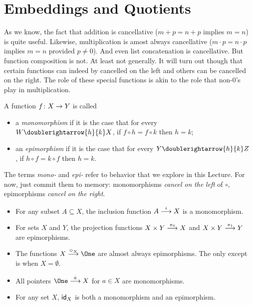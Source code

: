 \section{Embeddings and Quotients}

As we know, the fact that addition is cancellative ($m+p=n+p$ implies $m=n$) is quite useful. 
Likewise, multiplication is amost always cancellative ($m\cdot p=n\cdot p$ implies $m=n$ provided $p\neq 0$). 
And even list concatenation is cancellative. 
But function composition is not. 
At least not generally. It will turn out though that certain functions can indeed by cancelled on the left and others can be cancelled on the right. 
The role of these special functions is akin to the role that non-$0$'s play in multiplication. 

\begin{defn}
	A function $\fromto fXY$ is called
	\begin{itemize}
		\item a \emph{monomorphism} if it is the case that for every $W\doublerightarrow{h}{k}X$, if $f\circ h=f\circ k$ then $h=k$;
		\item an \emph{epimorphism} if it is the case that 
		for every $Y\doublerightarrow{h}{k}Z$, if $h\circ f=k\circ f$ then $h=k$.
	\end{itemize}
\end{defn}

The terms \emph{mono-} and \emph{epi-} refer to behavior that we explore in this Lecture. For now, just commit them to memory: monomorphisms \emph{cancel on the left} of $\circ$, epimorphisms \emph{cancel on the right}.

\begin{example}
	\begin{itemize}
	\item For any subset $A\subseteq X$, the inclusion function $\sfromto iAX$ is a monomorphism.
	\item  For sets $X$ and $Y$, the projection functions $\sfromto {\pi_0}{X\times Y}X$ and $\sfromto {\pi_1}{X\times Y}Y$ are epimorphisms.
	\item The functions $\sfromto {\Diamond_X}X\One$ are almost always epimorphisms. The only except is when $X=\emptyset$.
	\item All pointers $\sfromto {\hat a}{\One}X$ for $a\in X$ are monomorphisms.
	\item For any set $X$, $\id_X$ is both a monomorphism and an epimorphism.
	\end{itemize}
\end{example}


